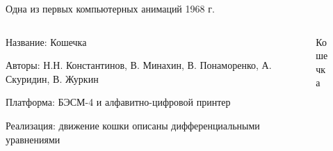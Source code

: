 \documentclass{beamer}
\begin{document}
\begin{frame}{Одна из первых компьютерных анимаций}
	{1968 г.}
	
	\begin{columns}
		\begin{column}{0.5\textwidth}
			
			Название: Кошечка
			
			Авторы: Н.Н. Константинов, В. Минахин, В. Понаморенко, А. Скуридин, В. Журкин
			
			Платформа: БЭСМ-4 и алфавитно-цифровой принтер
			
			Реализация: движение кошки описаны дифференциальными уравнениями
			
		\end{column}
		\begin{column}{0.5\textwidth}
			\begin{figure}
				\href{https://www.youtube.com/watch?v=LzMk5sC6eAU}{
				}
				\caption {Кошечка}
			\end{figure}
		\end{column}
	\end{columns}
\end{frame}
\end{document}
